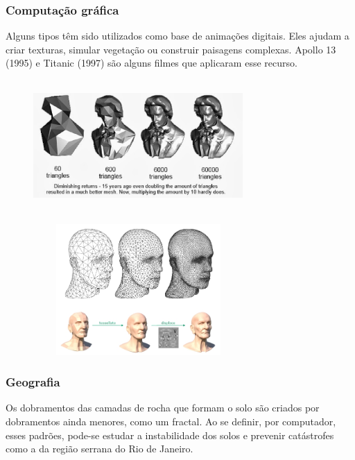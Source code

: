 \documentclass{beamer}
\begin{document}
\begin{frame}
\frametitle{Computação gráfica}
Alguns tipos têm sido utilizados como base de animações digitais. Eles ajudam a criar texturas, simular vegetação ou construir paisagens complexas. Apollo 13 (1995) e Titanic (1997) são alguns filmes que aplicaram esse recurso.
\end{frame}
\begin{frame}
	\begin{figure}[htb]
	\centering
    	    \includegraphics[width=8cm, height=5cm]{images/comp1.jpg}
       	        \vspace{0.01em}
	\end{figure}
\end{frame}
\begin{frame}
	\begin{figure}[htb]
	\centering
    	    \includegraphics[width=8cm, height=5cm]{images/comp2.jpg}
       	        \vspace{0.01em}
	\end{figure}
\end{frame}
\begin{frame}
\frametitle{Geografia}
Os dobramentos das camadas de rocha que formam o solo são criados por dobramentos ainda menores, como um fractal. Ao se definir, por computador, esses padrões, pode-se estudar a instabilidade dos solos e prevenir catástrofes como a da região serrana do Rio de Janeiro.
\end{frame}
\end{document}
